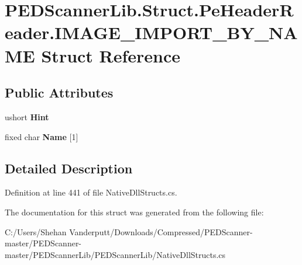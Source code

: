 \hypertarget{struct_p_e_d_scanner_lib_1_1_struct_1_1_pe_header_reader_1_1_i_m_a_g_e___i_m_p_o_r_t___b_y___n_a_m_e}{}\section{P\+E\+D\+Scanner\+Lib.\+Struct.\+Pe\+Header\+Reader.\+I\+M\+A\+G\+E\+\_\+\+I\+M\+P\+O\+R\+T\+\_\+\+B\+Y\+\_\+\+N\+A\+ME Struct Reference}
\label{struct_p_e_d_scanner_lib_1_1_struct_1_1_pe_header_reader_1_1_i_m_a_g_e___i_m_p_o_r_t___b_y___n_a_m_e}
\subsection*{Public Attributes}
\begin{DoxyCompactItemize}
\item 
\mbox{\label{struct_p_e_d_scanner_lib_1_1_struct_1_1_pe_header_reader_1_1_i_m_a_g_e___i_m_p_o_r_t___b_y___n_a_m_e_acec711cf65cfc2049990cf88010ef290}} 
ushort {\bfseries Hint}
\item 
\mbox{\label{struct_p_e_d_scanner_lib_1_1_struct_1_1_pe_header_reader_1_1_i_m_a_g_e___i_m_p_o_r_t___b_y___n_a_m_e_a023c321cbfd2ce6e35595b370ddebd2c}} 
fixed char {\bfseries Name} \mbox{[}1\mbox{]}
\end{DoxyCompactItemize}


\subsection{Detailed Description}


Definition at line 441 of file Native\+Dll\+Structs.\+cs.



The documentation for this struct was generated from the following file\+:\begin{DoxyCompactItemize}
\item 
C\+:/\+Users/\+Shehan Vanderputt/\+Downloads/\+Compressed/\+P\+E\+D\+Scanner-\/master/\+P\+E\+D\+Scanner-\/master/\+P\+E\+D\+Scanner\+Lib/\+P\+E\+D\+Scanner\+Lib/Native\+Dll\+Structs.\+cs\end{DoxyCompactItemize}
